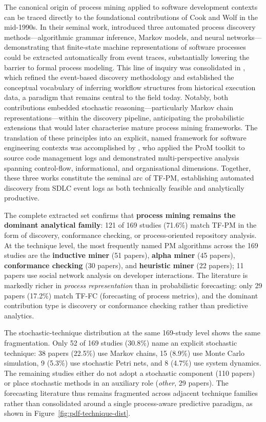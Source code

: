 The canonical origin of process mining applied to software development contexts
can be traced directly to the foundational contributions of Cook and Wolf in the
mid-1990s. In their seminal work, \cite{cook1995} introduced three automated
process discovery methods---algorithmic grammar inference, Markov models, and
neural networks---demonstrating that finite-state machine representations of
software processes could be extracted automatically from event traces,
substantially lowering the barrier to formal process modeling. This line of
inquiry was consolidated in \cite{cook1998}, which refined the event-based
discovery methodology and established the conceptual vocabulary of inferring
workflow structures from historical execution data, a paradigm that remains
central to the field today. Notably, both contributions embedded stochastic
reasoning---particularly Markov chain representations---within the discovery
pipeline, anticipating the probabilistic extensions that would later characterise
mature process mining frameworks. The translation of these principles into an
explicit, named framework for software engineering contexts was accomplished by
\cite{rubin2007}, who applied the ProM toolkit to source code management logs
and demonstrated multi-perspective analysis spanning control-flow, informational,
and organisational dimensions. Together, these three works constitute the seminal
arc of TF-PM, establishing automated discovery from SDLC event logs as both
technically feasible and analytically productive.

The complete extracted set confirms that \textbf{process mining remains the
dominant analytical family}: 121 of 169 studies (71.6\%) match TF-PM in the
form of discovery, conformance checking, or process-oriented repository
analysis. At the technique level, the most frequently named PM algorithms
across the 169 studies are the \textbf{inductive miner} (51 papers),
\textbf{alpha miner} (45 papers), \textbf{conformance checking} (30 papers),
and \textbf{heuristic miner} (22 papers); 11 papers use social network
analysis on developer interactions. The literature is markedly richer in
\emph{process representation} than in probabilistic forecasting: only 29
papers (17.2\%) match TF-FC (forecasting of process metrics), and the dominant
contribution type is discovery or conformance checking rather than predictive
analytics.

The stochastic-technique distribution at the same 169-study level shows the
same fragmentation. Only 52 of 169 studies (30.8\%) name an explicit
stochastic technique: 38 papers (22.5\%) use Markov chains, 15 (8.9\%) use
Monte Carlo simulation, 9 (5.3\%) use stochastic Petri nets, and 8 (4.7\%)
use system dynamics. The remaining studies either do not adopt a stochastic
component (110 papers) or place stochastic methods in an auxiliary role
(\textit{other}, 29 papers). The forecasting literature thus remains
fragmented across adjacent technique families rather than consolidated around
a single process-aware predictive paradigm, as shown in
Figure~\ref{fig:pdf-technique-dist}.

